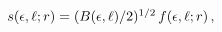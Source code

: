 $\mathop{s\/}\nolimits\!\left(\epsilon,\ell;r\right)=(B(\epsilon,\ell)/2)^{1/2}%
\mathop{f\/}\nolimits\!\left(\epsilon,\ell;r\right),$